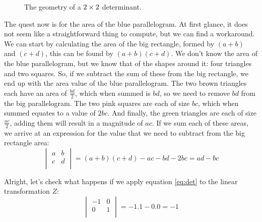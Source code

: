 \documentclass[a4,12pt,twosided,openany]{memoir}
\begin{document}
\begin{figure}[h!]
\begin{center}
\end{center}
\caption{The geometry of a $\protect2 \times 2$ determinant.}
\end{figure}
\par 
\indent

The quest now is for the area of the blue parallelogram. At first glance, it does not seem like a straightforward thing to compute, but we can find a workaround. We can start by calculating the area of the big rectangle, formed by $(a+b)$ and $(c+d)$, this can be found by $(a+b)(c+d)$. We don’t know the area of the blue parallelogram, but we know that of the shapes around it: four triangles and two squares. So, if we subtract the sum of these from the big rectangle, we end up with the area value of the blue parallelogram. The two brown triangles each have an area of $\frac{bd}{2}$, which when summed is $bd$, so we need to remove $bd$ from the big parallelogram. The two pink squares are each of size $bc$, which when summed equates to a value of $2bc$. And finally,  the green triangles are each of size $\frac{ac}{2}$, adding them will result in a magnitude of $ac$. If we sum each of these areas, we arrive at an expression for the value that we need to subtract from the big rectangle area:
\[\begin{vmatrix}
a & b   \\
c & d \\
\end{vmatrix} = (a+b)(c+d)-ac-bd-2bc = ad-bc
\]
\par 
\indent
Alright, let’s check what happens if we apply equation \ref{eq:det} to the linear transformation $Z$:
\begin{equation*}
\begin{vmatrix}
-1 & 0   \\
0 & 1 \\
\end{vmatrix} = -1.1 - 0.0 = -1
\end{equation*}
\par 
\end{document}
